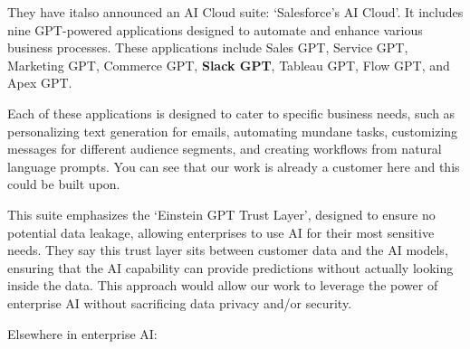 They have it{also} announced an AI Cloud suite: `Salesforce's AI Cloud'. It includes nine GPT-powered applications designed to automate and enhance various business processes. These applications include Sales GPT, Service GPT, Marketing GPT, Commerce GPT, \textbf{Slack GPT}, Tableau GPT, Flow GPT, and Apex GPT. \par
Each of these applications is designed to cater to specific business needs, such as personalizing text generation for emails, automating mundane tasks, customizing messages for different audience segments, and creating workflows from natural language prompts. You can see that our work is already a customer here and this could be built upon.\par 
This suite emphasizes the `Einstein GPT Trust Layer', designed to ensure no potential data leakage, allowing enterprises to use AI for their most sensitive needs. They say this trust layer sits between customer data and the AI models, ensuring that the AI capability can provide predictions without actually looking inside the data. This approach would allow our work to leverage the power of enterprise AI without sacrificing data privacy and/or security.\par
Elsewhere in enterprise AI:
